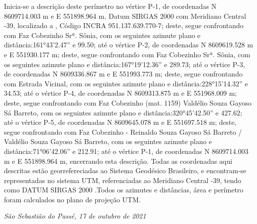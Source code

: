 \documentclass[10.8pt, a4paper]{article}
\begin{document}

\vspace{1cm}

Inicia-se a descrição deste perímetro no vértice P-1, de coordenadas N 8609714.003 m e E 551898.964 m, Datum SIRGAS 2000  com Meridiano Central -39, localizado a , Código INCRA 951.137.639.770-7;  deste, segue confrontando com Faz Cobezinho Srª. Sônia, com os seguintes azimute plano e distância:161°43'2.47'' e 99.50; até o vértice P-2, de coordenadas N 8609619.528 m e E 551930.177 m; deste, segue confrontando com Faz Cobezinho Srª. Sônia, com os seguintes azimute plano e distância:167°19'12.36'' e 289.73; até o vértice P-3, de coordenadas N 8609336.867 m e E 551993.773 m; deste, segue confrontando com Estrada Vicinal, com os seguintes azimute plano e distância:228°15'14.32'' e 34.53; até o vértice P-4, de coordenadas N 8609313.875 m e E 551968.009 m; deste, segue confrontando com Faz Cobezinho (mat. 1159) Valdélio Souza Gayoso Sá Barreto, com os seguintes azimute plano e distância:320°45'42.50'' e 427.62; até o vértice P-5, de coordenadas N 8609645.078 m e E 551697.518 m; deste, segue confrontando com Faz Cobezinho - Reinaldo Souza Gayoso Sá Barreto / Valdélio Souza Gayoso Sá Barreto, com os seguintes azimute plano e distância:71°06'42.06'' e 212.91; até o vértice P-1, de coordenadas N 8609714.003 m e E 551898.964 m, encerrando esta descrição. Todas as coordenadas aqui descritas estão georrefereciadas ao Sistema Geodésico Brasileiro, e encontram-se representadas no sistema UTM, referenciadas ao Meridiano Central -39, tendo como DATUM SIRGAS 2000 .Todos os azimutes e distâncias, área e perímetro foram calculados no plano de projeção UTM.
\vspace{1cm}
\begin{flushright}
	\emph{São Sebastião do Passé, 17 de outubro de 2021}
\end{flushright}
\vspace{0.5cm}

\end{document}
